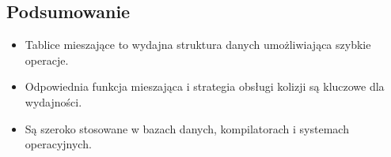 \subsection{Podsumowanie}
\begin{itemize}
    \item Tablice mieszające to wydajna struktura danych umożliwiająca szybkie operacje.
    \item Odpowiednia funkcja mieszająca i strategia obsługi kolizji są kluczowe dla wydajności.
    \item Są szeroko stosowane w bazach danych, kompilatorach i systemach operacyjnych.
\end{itemize}